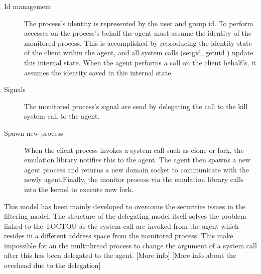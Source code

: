 \begin{description}
\begin{description}
							 \item[Id management]    The process's identity is represented by the user and group id.  To perform accesses on the process's behalf the agent must
							 						 assume the identity of the monitored process. This is accomplished by reproducing the identity state of the client within 
							 						  the agent, and all system calls (setgid, getuid ) update this internal state.
							 						  When the agent performs a call on the client behalf's, it assumes the identity saved in this internal state.  
							 						
							 \item[Signals]        The monitored process's signal are send by delegating the call to the kill system call to the agent. 
							 
							 \item[Spawn new process] When the client process invokes a system call such as clone or fork, the emulation library notifies this to the agent. The 
							 						  agent then spawns a new agent process and returns a new domain socket to communicate with the newly agent.Finally, the
							 						  monitor process via the emulation library calls into the kernel to execute new fork. 
							 
							 \end{description}
	
\end{description}

This model has been mainly developed to overcome the securities issues in the filtering model. The structure of the delegating model itself solves the problem linked to the TOCTOU as the system call are invoked from the agent which resides in a different address space from the monitored process. This make impossible for an the multithread process to change the argument of a system call after this has been delegated to the agent.
[More info]
[More info about the overhead due to the delegation] 



